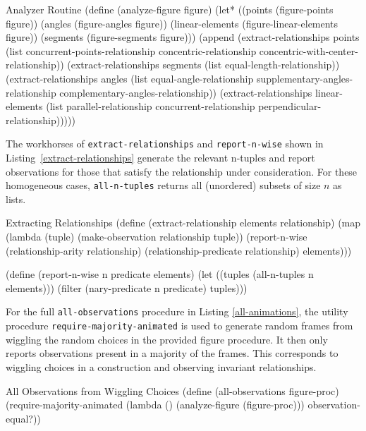 \begin{code-listing}
[label=analyzer]
{Analyzer Routine}
(define (analyze-figure figure)
  (let* ((points (figure-points figure))
         (angles (figure-angles figure))
         (linear-elements (figure-linear-elements figure))
         (segments (figure-segments figure)))
    (append
     (extract-relationships points
                            (list concurrent-points-relationship
                                  concentric-relationship
                                  concentric-with-center-relationship))
     (extract-relationships segments
                             (list equal-length-relationship))
     (extract-relationships angles
                             (list equal-angle-relationship
                                   supplementary-angles-relationship
                                   complementary-angles-relationship))
     (extract-relationships linear-elements
                             (list parallel-relationship
                                   concurrent-relationship
                                   perpendicular-relationship)))))
\end{code-listing}

The workhorses of \texttt{extract-relationships} and
\texttt{report-n-wise} shown in Listing~\ref{extract-relationships}
generate the relevant n-tuples and report observations for those that
satisfy the relationship under consideration. For these homogeneous
cases, \texttt{all-n-tuples} returns all (unordered) subsets of size
$n$ as lists.

\begin{code-listing}
[label=extract-relationships]
{Extracting Relationships}
(define (extract-relationship elements relationship)
  (map (lambda (tuple) (make-observation relationship tuple))
       (report-n-wise
        (relationship-arity relationship)
        (relationship-predicate relationship)
        elements)))

(define (report-n-wise n predicate elements)
  (let ((tuples (all-n-tuples n elements)))
    (filter (nary-predicate n predicate) tuples)))
\end{code-listing}

For the full \texttt{all-observations} procedure in Listing
\ref{all-animations}, the utility procedure
\texttt{require-majority-animated} is used to generate random frames
from wiggling the random choices in the provided figure procedure. It
then only reports observations present in a majority of the
frames. This corresponds to wiggling choices in a construction and
observing invariant relationships.
\enlargethispage*{\baselineskip}
\begin{code-listing}
[label=all-animations]
{All Observations from Wiggling Choices}
(define (all-observations figure-proc)
  (require-majority-animated
   (lambda () (analyze-figure (figure-proc)))
   observation-equal?))
\end{code-listing}

